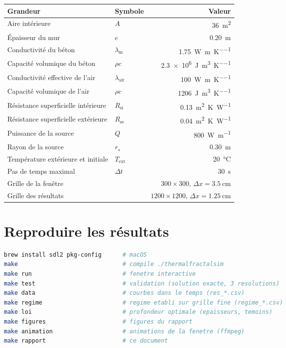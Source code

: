 \documentclass[11pt,a4paper]{article}
\theoremstyle{definition}
\theoremstyle{remark}
\newcommand{\dx}{\Delta x}
\newcommand{\dt}{\Delta t}
\newcommand{\Text}{T_{\mathrm{ext}}}
\newcommand{\Rsi}{R_{\mathrm{si}}}
\newcommand{\Rse}{R_{\mathrm{se}}}
\newcommand{\la}{\lambda_{\mathrm{air}}}
\newcommand{\lm}{\lambda_{\mathrm{m}}}
\begin{document}
\begin{center}
\begin{tabular}{llr}
\toprule
Grandeur & Symbole & Valeur\\
\midrule
Aire intérieure & $A$ & \qty{36}{\square\metre}\\
Épaisseur du mur & $e$ & \qty{0,20}{\metre}\\
Conductivité du béton & $\lm$ & \qty{1,75}{\watt\per\metre\per\kelvin}\\
Capacité volumique du béton & $\rho c$ & \qty{2,3e6}{\joule\per\cubic\metre\per\kelvin}\\
Conductivité effective de l'air & $\la$ & \qty{100}{\watt\per\metre\per\kelvin}\\
Capacité volumique de l'air & $\rho c$ & \qty{1206}{\joule\per\cubic\metre\per\kelvin}\\
Résistance superficielle intérieure & $\Rsi$ & \qty{0,13}{\square\metre\kelvin\per\watt}\\
Résistance superficielle extérieure & $\Rse$ & \qty{0,04}{\square\metre\kelvin\per\watt}\\
Puissance de la source & $Q$ & \qty{800}{\watt\per\metre}\\
Rayon de la source & $r_s$ & \qty{0,30}{\metre}\\
Température extérieure et initiale & $\Text$ & \qty{20}{\degreeCelsius}\\
Pas de temps maximal & $\dt$ & \qty{30}{\second}\\
Grille de la fenêtre & & $300\times300$, $\dx = \qty{3,5}{\centi\metre}$\\
Grille des résultats & & $1200\times1200$, $\dx = \qty{1,25}{\centi\metre}$\\
\bottomrule
\end{tabular}
\end{center}

\section{Reproduire les résultats}

\begin{lstlisting}[language=bash,numbers=none,caption={Commandes, depuis la racine du dépôt}]
brew install sdl2 pkg-config      # macOS
make                              # compile ./thermalfractalsim
make run                          # fenetre interactive
make test                         # validation (solution exacte, 3 resolutions)
make data                         # courbes dans le temps (res_*.csv)
make regime                       # regime etabli sur grille fine (regime_*.csv)
make loi                          # profondeur optimale (epaisseurs, temoins)
make figures                      # figures du rapport
make animation                    # animations de la fenetre (ffmpeg)
make rapport                      # ce document
\end{lstlisting}
\end{document}
